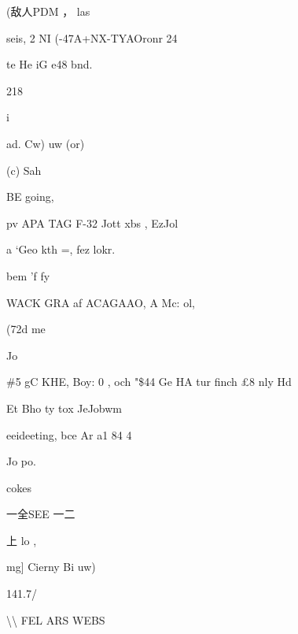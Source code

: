 \documentclass[UTF8,12pt,a4paper,openany]{ctexbook}
\begin{document}
\begin{enumerate}[label=\textbf{\arabic*.},leftmargin=2em]
             (敌人PDM ， las\par seis, 2 NI       (-47A+NX-TYAOronr 24\par te He iG e48 bnd.\par 218\par i\par ad. Cw)             uw (or)\par (c) Sah\par BE going,\par pv     APA TAG F-32 Jott xbs , EzJol\par a         ‘Geo kth =, fez lokr.\par bem 'f          fy\par WACK GRA af ACAGAAO, A Mc: ol,\par (72d me\par Jo\par \#5 gC KHE, Boy: 0 , och "\$44 Ge HA tur finch £8 nly Hd\par Et Bho ty tox JeJobwm\par eeideeting,        bce Ar a1 84 4\par Jo                                 po.\par cokes\par 一全SEE        一二\par 上                                       lo     ,\par mg] Cierny                  Bi uw)\par 141.7/\par \textbackslash{}\textbackslash{} FEL ARS WEBS 
\end{enumerate}
\end{document}
